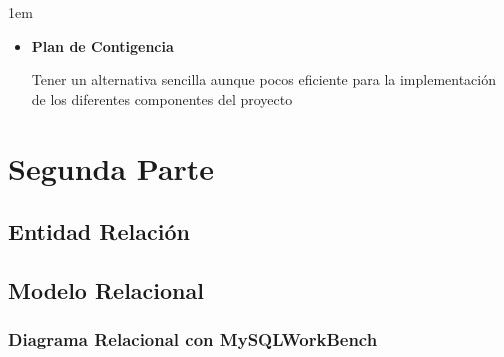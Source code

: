 \documentclass[12pt, fleqn]{report}                             %
\newenvironment{SmallIndentation}[1][0.75em]                    %
    {\begin{adjustwidth}{#1}{}\begin{footnotesize}}                 %
    {\end{footnotesize}\end{adjustwidth}}                           %
\begin{document}
\begin{SmallIndentation}[1em]
\begin{itemize}
                        \item
                            \textbf{Plan de Contigencia}

                                Tener un alternativa sencilla aunque pocos 
                                eficiente para la implementación de los 
                                diferentes componentes del proyecto

                    \end{itemize}
                
                \end{SmallIndentation}
                    



\chapter{Segunda Parte}
\clearpage

    \clearpage
    \section{Entidad Relación}


    \clearpage
    \section{Modelo Relacional}

        \subsection{Diagrama Relacional con MySQLWorkBench}
\end{document}
